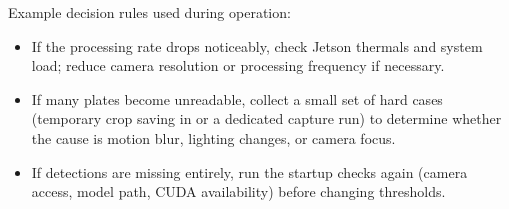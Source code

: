 \noindent
Example decision rules used during operation:
\begin{itemize}
	\item If the processing rate drops noticeably, check Jetson thermals and system load; reduce camera resolution or processing frequency if necessary.
	\item If many plates become unreadable, collect a small set of hard cases (temporary crop saving in  or a dedicated capture run) to determine whether the cause is motion blur, lighting changes, or camera focus.
	\item If detections are missing entirely, run the startup checks again (camera access, model path, CUDA availability) before changing thresholds.
\end{itemize}
